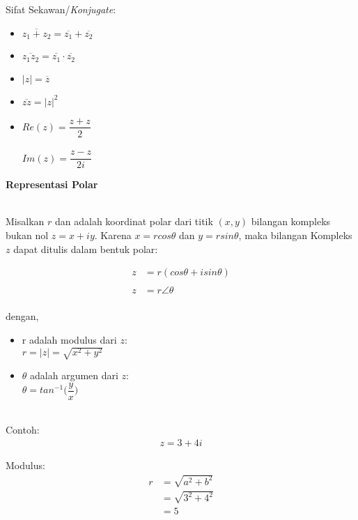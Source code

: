 \documentclass{article}
\begin{document}
    Sifat Sekawan/\textit{Konjugate}:
    \begin{itemize}
        \item $\overline{z_1 + z_2} = \overline{z_1} + \overline{z_2}$
        \item $\overline{z_1 z_2} = \overline{z_1} \cdot \overline{z_2}$
        \item $|z| = \overline{z}$
        \item $\overline{zz} = |z|^2$
        \item $Re(z) = \dfrac{z+z}{2}$\\ \\
            $Im(z) = \dfrac{z-z}{2i}$
    \end{itemize}

    \newpage
    \begin{center}
        \textbf{Representasi Polar}
    \end{center}
    \leavevmode\\

    Misalkan $r$ dan adalah koordinat polar dari titik $(x, y)$ bilangan kompleks bukan nol $z = x + iy$. Karena $x = r cos \theta $ dan $y = r sin \theta$, maka bilangan Kompleks $z$ dapat
    ditulis dalam bentuk polar:

    \begin{align}
        z &= r(cos \theta + i sin \theta)
        \\\nonumber\\
        z &= r \angle \theta
        \\\nonumber
    \end{align}

    dengan,
    \begin{itemize}
        \item r adalah modulus dari $z$:\\
            $ r = |z| = \sqrt{x^2+y^2} $
        \item $\theta$ adalah argumen dari $z$:\\
            $ \theta = tan^{-1} \bigg(\dfrac{y}{x}\bigg) $
    \end{itemize}
    \leavevmode\\

    Contoh:
    \begin{align}
        z = 3 + 4i \nonumber
    \end{align}

    Modulus:
    \begin{align}
        r   &= \sqrt{a^2 + b^2}
            \nonumber\\
            &= \sqrt{3^2 + 4^2}
            \nonumber\\
            &= 5
            \nonumber
    \end{align}
    
\end{document}

